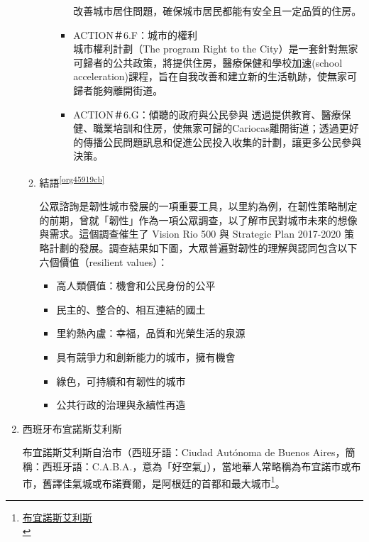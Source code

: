 \documentclass[a4paper,12pt]{article}
\begin{document}
\begin{enumerate}
\begin{enumerate}
\begin{enumerate}
\begin{itemize}
改善城市居住問題，確保城市居民都能有安全且一定品質的住房。\\
\item ACTION＃6.F：城市的權利\\
城市權利計劃（The program Right to the City）是一套針對無家可歸者的公共政策，將提供住房，醫療保健和學校加速(school acceleration)課程，旨在自我改善和建立新的生活軌跡，使無家可歸者能夠離開街道。\\
\item ACTION＃6.G：傾聽的政府與公民參與  透過提供教育、醫療保健、職業培訓和住房，使無家可歸的Cariocas離開街道；透過更好的傳播公民問題訊息和促進公民投入收集的計劃，讓更多公民參與決策。\\
\end{itemize}
\end{enumerate}
\item 結語\textsuperscript{\ref{org45919cb}}
\label{sec:org827f2f7}

公眾諮詢是韌性城市發展的一項重要工具，以里約為例，在韌性策略制定的前期，曾就「韌性」作為一項公眾調查，以了解市民對城市未來的想像與需求。這個調查催生了 Vision Rio 500 與 Strategic Plan 2017-2020 策略計劃的發展。調查結果如下圖，大眾普遍對韌性的理解與認同包含以下六個價值（resilient values）：\\
\begin{itemize}
\item 高人類價值：機會和公民身份的公平\\
\item 民主的、整合的、相互連結的國土\\
\item 里約熱內盧：幸福，品質和光榮生活的泉源\\
\item 具有競爭力和創新能力的城市，擁有機會\\
\item 綠色，可持續和有韌性的城市\\
\item 公共行政的治理與永續性再造\\
\end{itemize}
\end{enumerate}

\item 西班牙布宜諾斯艾利斯
\label{sec:orgba52b74}

布宜諾斯艾利斯自治市（西班牙語：Ciudad Autónoma de Buenos Aires，簡稱：西班牙語：C.A.B.A.，意為「好空氣」），當地華人常略稱為布宜諾市或布市，舊譯佳氣城或布諾賽爾，是阿根廷的首都和最大城市\footnote{\href{https://zh.wikipedia.org/wiki/\%E5\%B8\%83\%E5\%AE\%9C\%E8\%AB\%BE\%E6\%96\%AF\%E8\%89\%BE\%E5\%88\%A9\%E6\%96\%AF}{布宜諾斯艾利斯}\\}。\\


\end{enumerate}
\end{document}
